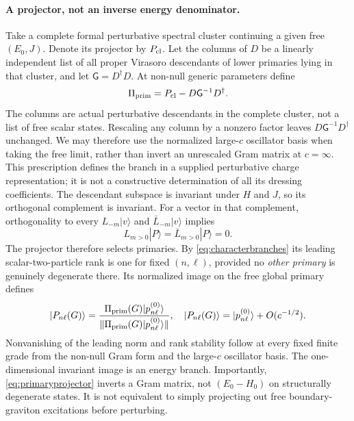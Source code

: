 \documentclass[11pt,a4paper]{article}
\numberwithin{equation}{section}
\theoremstyle{remark}\newtheorem{remark}[theorem]{Remark}
\begin{document}
\paragraph{A projector, not an inverse energy denominator.}
Take a complete formal perturbative spectral cluster continuing a given free $(E_0,J)$. Denote its projector by $P_{\rm cl}$. Let the columns of $D$ be a linearly independent list of all proper Virasoro descendants of lower primaries lying in that cluster, and let $\mathsf G=D^\dagger D$. At non-null generic parameters define
\begin{equation}
 \Pi_{\rm prim}=P_{\rm cl}-D\mathsf G^{-1}D^\dagger.
 \label{eq:primaryprojector}
\end{equation}
The columns are actual perturbative descendants in the complete cluster, not a list of free scalar states. Rescaling any column by a nonzero factor leaves $D\mathsf G^{-1}D^\dagger$ unchanged. We may therefore use the normalized large-$c$ oscillator basis when taking the free limit, rather than invert an unrescaled Gram matrix at $c=\infty$. This prescription defines the branch in a supplied perturbative charge representation; it is not a constructive determination of all its dressing coefficients.
The descendant subspace is invariant under $H$ and $J$, so its orthogonal complement is invariant. For a vector in that complement, orthogonality to every $L_{-m}|v\rangle$ and $\bar L_{-m}|v\rangle$ implies
\begin{equation}
 L_{m>0}|P\rangle=\bar L_{m>0}|P\rangle=0.
\end{equation}
The projector therefore selects primaries. By \eqref{eq:characterbranches} its leading scalar-two-particle rank is one for fixed $(n,\ell)$, provided no \emph{other primary} is genuinely degenerate there. Its normalized image on the free global primary defines
\begin{equation}
 |P_{n\ell}(G)\rangle=
 \frac{\Pi_{\rm prim}(G)|p^{(0)}_{n\ell}\rangle}
 {\|\Pi_{\rm prim}(G)|p^{(0)}_{n\ell}\rangle\|},
 \quad |P_{n\ell}(G)\rangle=|p^{(0)}_{n\ell}\rangle+O(c^{-1/2}).
 \label{eq:branchdefinition}
\end{equation}
Nonvanishing of the leading norm and rank stability follow at every fixed finite grade from the non-null Gram form and the large-$c$ oscillator basis. The one-dimensional invariant image is an energy branch. Importantly, \eqref{eq:primaryprojector} inverts a Gram matrix, not $(E_0-H_0)$ on structurally degenerate states. It is not equivalent to simply projecting out free boundary-graviton excitations before perturbing.
\end{document}
